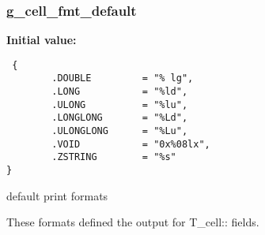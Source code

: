 \subsubsection{ g\_\-cell\_\-fmt\_\-default}\label{group__table__cell_a0}


{\bf Initial value:}

\footnotesize\begin{verbatim} {
        .DOUBLE         = "% lg",
        .LONG           = "%ld",
        .ULONG          = "%lu",
        .LONGLONG       = "%Ld",
        .ULONGLONG      = "%Lu",
        .VOID           = "0x%08lx",
        .ZSTRING        = "%s"
}\end{verbatim}\normalsize 
default print formats

These formats defined the output for T\_\-cell:: fields. 